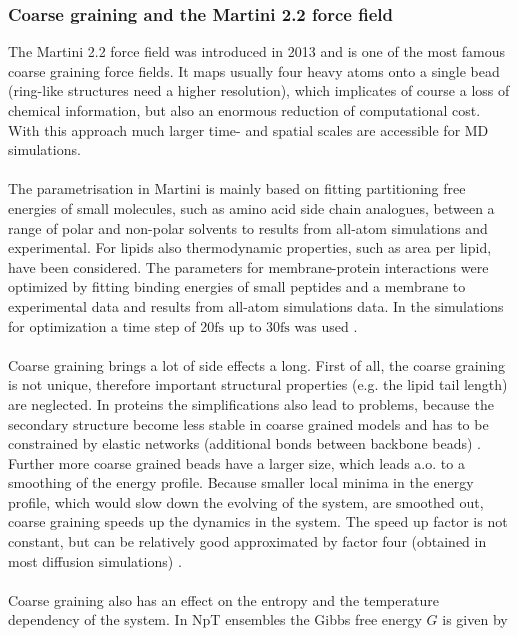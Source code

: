 \subsubsection{Coarse graining and the Martini 2.2 force field}
The Martini 2.2 \autocites{martini22_lipids}{martini22} force field was introduced in 2013 and is one of the most famous coarse graining force fields. It maps usually four heavy atoms onto a single bead (ring-like structures need a higher resolution), which implicates of course a loss of chemical information, but also an enormous reduction of computational cost. With this approach much larger time- and spatial scales are accessible for MD simulations.\\
\\
The parametrisation in Martini is mainly based on fitting partitioning free energies of small molecules, such as amino acid side chain analogues, between a range of polar and non-polar solvents to results from all-atom simulations and experimental. For lipids also thermodynamic properties, such as area per lipid, have been considered. The parameters for membrane-protein interactions were optimized by fitting binding energies of small peptides and a membrane to experimental data and results from all-atom simulations data. In the simulations for optimization a time step of 20$\si{\femto\second}$ up to 30$\si{\femto\second}$ was used \autocites{martini22}{martini22_lipids}.\\
\\
Coarse graining brings a lot of side effects a long. First of all, the coarse graining is not unique, therefore important structural properties (e.g. the lipid tail length) are neglected. In proteins the simplifications also lead to problems, because the secondary structure become less stable in coarse grained models and has to be constrained by elastic networks (additional bonds between backbone beads) \autocite[p. 6812]{martini22_check}.\\
Further more coarse grained beads have a larger size, which leads a.o. to a smoothing of the energy profile. Because smaller local minima in the energy profile, which would slow down the evolving of the system, are smoothed out, coarse graining speeds up the dynamics in the system. The speed up factor is not constant, but can be relatively good approximated by factor four (obtained in most diffusion simulations) \autocites[p. 6810]{martini22_check}[p. 7815]{martini}.\\
\\
Coarse graining also has an effect on the entropy and the temperature dependency of the system. In NpT ensembles the Gibbs free energy $G$ is given by
